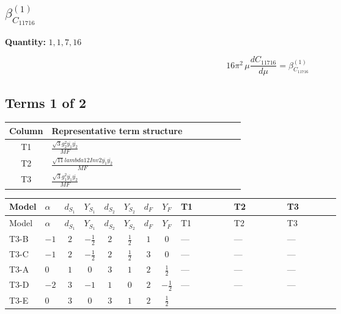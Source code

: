 \documentclass[8pt]{article}
\begin{document}
\begin{landscape}
\section*{$\beta_{C_{11716}}^{(1)}$}
\noindent\textbf{Quantity: }$\mathrm{1,1,7,16}$\par\smallskip
\[16\pi^2\,\mu\frac{d C_{11716}}{d\mu}=\beta_{C_{11716}}^{(1)}\]
\subsection*{Terms 1 of 2}
\begin{center}
\begin{tabular}{@{}c >{\raggedright\arraybackslash}p{0.82\linewidth}@{}}
\toprule
Column & Representative term structure \\
\midrule
T1 & \(\displaystyle \frac{\sqrt{3} g_{2}^{2} \overline{y_{1}} \overline{y_{2}}}{MF}\) \\
\midrule
T2 & \(\displaystyle \frac{\sqrt{11} lambda12Inv2 \overline{y_{1}} \overline{y_{2}}}{MF}\) \\
\midrule
T3 & \(\displaystyle \frac{\sqrt{3} g_{1}^{2} \overline{y_{1}} \overline{y_{2}}}{MF}\) \\
\midrule
\bottomrule
\end{tabular}
\end{center}
\smallskip
\tiny
\begin{longtable}{@{}llcccccc >{\raggedright\arraybackslash}p{0.21\linewidth} >{\raggedright\arraybackslash}p{0.21\linewidth} >{\raggedright\arraybackslash}p{0.21\linewidth}@{}}
\toprule
Model & $\alpha$ & $d_{S_1}$ & $Y_{S_1}$ & $d_{S_2}$ & $Y_{S_2}$ & $d_F$ & $Y_F$ & T1 & T2 & T3 \\
\midrule
\endfirsthead
\toprule
Model & $\alpha$ & $d_{S_1}$ & $Y_{S_1}$ & $d_{S_2}$ & $Y_{S_2}$ & $d_F$ & $Y_F$ & T1 & T2 & T3 \\
\midrule
\endhead
T3-B & $-1$ & $2$ & $-\frac{1}{2}$ & $2$ & $\frac{1}{2}$ & $1$ & $0$ & --- & --- & --- \\
\midrule
T3-C & $-1$ & $2$ & $-\frac{1}{2}$ & $2$ & $\frac{1}{2}$ & $3$ & $0$ & --- & --- & --- \\
\midrule
T3-A & $0$ & $1$ & $0$ & $3$ & $1$ & $2$ & $\frac{1}{2}$ & --- & --- & --- \\
\midrule
T3-D & $-2$ & $3$ & $-1$ & $1$ & $0$ & $2$ & $-\frac{1}{2}$ & --- & --- & --- \\
\midrule
T3-E & $0$ & $3$ & $0$ & $3$ & $1$ & $2$ & $\frac{1}{2}$ & \scriptsize\adjustbox{max width=\linewidth}{$\begin{gathered} - \frac{11 \sqrt{3} g_{2}^{2} \overline{y_{1}} \overline{y_{2}}}{8 MF}\end{gathered}$} & \scriptsize\adjustbox{max width=\linewidth}{$\begin{gathered} - \frac{3 \sqrt{11} lambda12Inv2 \overline{y_{1}} \overline{y_{2}}}{22 MF}\end{gathered}$} & \scriptsize\adjustbox{max width=\linewidth}{$\begin{gathered} - \frac{\sqrt{3} g_{1}^{2} \overline{y_{1}} \overline{y_{2}}}{8 MF}\end{gathered}$} \\

\end{longtable}
\end{landscape}
\end{document}
